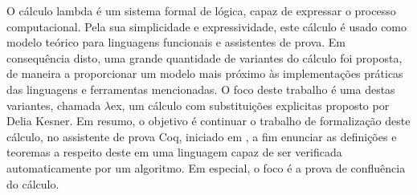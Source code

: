 O cálculo lambda é um sistema formal de lógica, capaz de expressar o processo computacional.
Pela sua simplicidade e expressividade, este cálculo é usado como modelo teórico
para linguagens funcionais e assistentes de prova. Em consequência disto, 
uma grande quantidade de variantes do cálculo foi proposta, de maneira a proporcionar
um modelo mais próximo às implementações práticas das linguagens e ferramentas mencionadas.
O foco deste trabalho é uma destas variantes, chamada $\lambda$ex, um cálculo com substituições explicitas proposto por Delia Kesner.
Em resumo, o objetivo é continuar o trabalho de formalização
deste cálculo, no assistente de prova Coq, iniciado em \cite{initial}, a fim enunciar as definições e teoremas a respeito
deste em uma linguagem capaz de ser verificada automaticamente por um algoritmo.
Em especial, o foco é a prova de confluência do cálculo.
